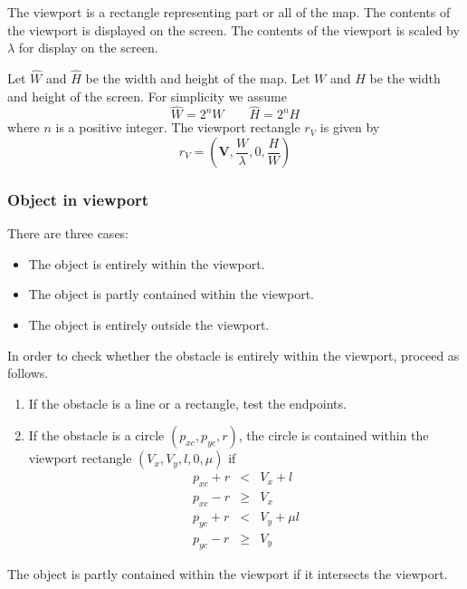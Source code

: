 \documentclass[11pt]{article}
\newcommand{\Hhat}{\widehat{H}}
\newcommand{\pxc}{p_{xc}}
\newcommand{\pyc}{p_{yc}}
\newcommand{\Vb}{\mathbf{V}}
\newcommand{\What}{\widehat{W}}
\begin{document}
The viewport is a rectangle representing part or all of the map. The contents
of the viewport is displayed on the screen. The contents of the viewport is
scaled by $\lambda$ for display on the screen. 

Let $\What$ and $\Hhat$ be the width and height of the map. Let $W$ and $H$ 
be the width and height of the screen. For simplicity we assume 
\begin{equation}
    \What = 2^n W \qquad \Hhat = 2^n H\label{eq-map-coordinates}
\end{equation}
where $n$ is a positive integer. The viewport rectangle $r_{V}$ 
is given by 
\begin{equation}
    r_{V}=\left(\Vb, \frac{W}{\lambda}, 0, \frac{H}{W}\right)
\end{equation}

\subsubsection{Object in viewport}
\label{sec-map-implementation-obstacle-in-viewport}
 

There are three cases:
\begin{itemize}
    \item The object is entirely within the viewport.
    \item The object is partly contained within the viewport.
    \item The object is entirely outside the viewport.
\end{itemize}

In order to check whether the obstacle is entirely within the viewport, proceed
as follows.
\begin{enumerate}
    \item If the obstacle is a line or a rectangle, test the endpoints.
    \item If the obstacle is a circle $(\pxc,\pyc,r)$, the circle is 
        contained within the viewport rectangle $(V_{x}, V_{y}, l, 0, \mu)$ 
        if
        \begin{eqnarray*}
            \pxc + r &<& V_{x} + l\\
            \pxc - r &\geq& V_{x}\\
            \pyc + r &<& V_{y} + \mu l\\
            \pyc - r &\geq& V_{y}
        \end{eqnarray*}
\end{enumerate}

The object is partly contained within the viewport if it intersects the
viewport.
\end{document}

